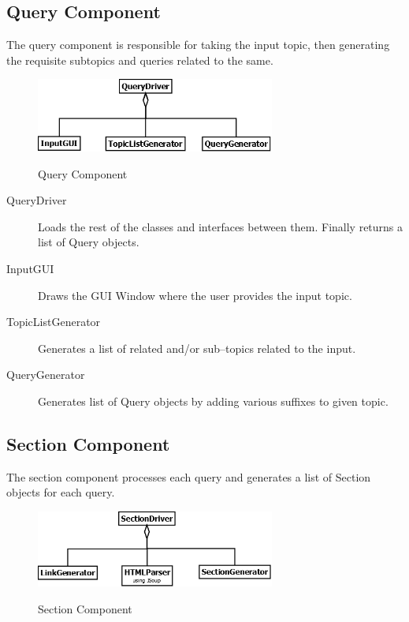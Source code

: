 \documentclass[10pt,a4paper]{report}
\begin{document}
\clearpage


\subsection{Query Component}

The query component is responsible for taking the input topic, then generating the requisite subtopics and queries related to the same. \\
\begin{figure}[h!]
\centering
\includegraphics[width=0.70\textwidth]{./diagrams/Query}\\
\caption{Query Component}
\end{figure}

\begin{description}
	\item[QueryDriver] Loads the rest of the classes and interfaces between them. Finally returns a list of Query objects. 
	\item[InputGUI] Draws the GUI Window where the user provides the input topic.
	\item[TopicListGenerator] Generates a list of related and/or sub--topics related to the input.
	\item[QueryGenerator] Generates list of Query objects by adding various suffixes to given topic.
\end{description}

\clearpage


\subsection{Section Component}

The section component processes each query and generates a list of Section objects for each query. \\

\begin{figure}[h!]
\centering
\includegraphics[width=0.70\textwidth]{./diagrams/Section}\\
\caption{Section Component}
\end{figure}
\end{document}
